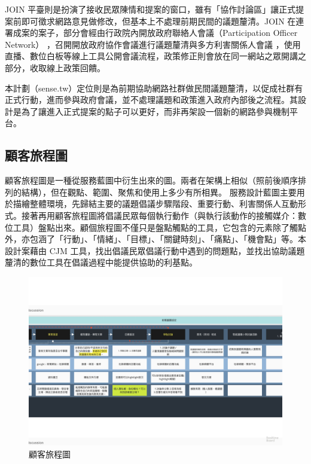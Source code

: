 \documentclass[12pt,a4paper]{article}
\begin{document}
\begin{enumerate}
JOIN 平臺則是扮演了接收民眾陳情和提案的窗口，雖有「協作討論區」讓正式提案前即可徵求網路意見做修改，但基本上不處理前期民間的議題釐清。JOIN 在連署成案的案子，部分會經由行政院內開放政府聯絡人會議（Participation Officer Network）\citep*{lin17} ，召開開放政府協作會議進行議題釐清與多方利害關係人會議 ，使用直播、數位白板等線上工具公開會議流程，政策修正則會放在同一網站之眾開講之部分，收取線上政策回饋。

本計劃（sense.tw）定位則是為前期協助網路社群做民間議題釐清，以促成社群有正式行動，進而參與政府會議，並不處理議題和政策進入政府內部後之流程。其設計是為了讓進入正式提案的點子可以更好，而非再架設一個新的網路參與機制平台。
\end{enumerate}
\subsection{顧客旅程圖 }
\label{sec:org64c6ed3}
顧客旅程圖是一種從服務藍圖中衍生出來的圖。兩者在架構上相似（照前後順序排列的結構），但在觀點、範圍、聚焦和使用上多少有所相異。\cite{james2017} 服務設計藍圖主要用於描繪整體環境，先歸結主要的議題倡議步驟階段、重要行動、利害關係人互動形式。接著再用顧客旅程圖將倡議民眾每個執行動作（與執行該動作的接觸媒介：數位工具）盤點出來。顧個旅程圖不僅只是盤點觸點的工具，它包含的元素除了觸點外，亦包涵了「行動」、「情緒」、「目標」、「關鍵時刻」、「痛點」、「機會點」等。本設計案藉由 CJM 工具，找出倡議民眾倡議行動中遇到的問題點，並找出協助議題釐清的數位工具在倡議過程中能提供協助的利基點。
\begin{figure}[htbp]
\centering
\includegraphics[width=.9\linewidth]{./images/cmj1.jpg}
\caption{\label{fig:org873818b}
顧客旅程圖}
\end{figure}
\end{document}
